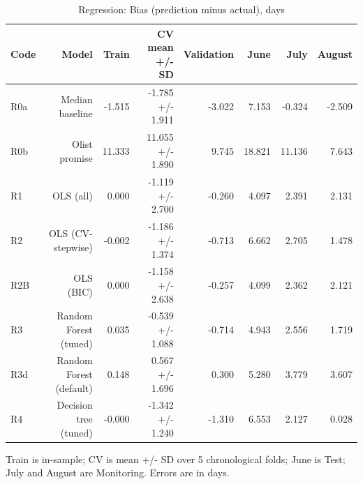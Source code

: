 \begin{table}[htbp]
\centering
\small
\caption{Regression: Bias (prediction minus actual), days}
\begin{tabular}{lrrrrrrr}
\toprule
Code & Model & Train & CV mean +/- SD & Validation & June & July & August \\
\midrule
R0a & Median baseline & -1.515 & -1.785 +/- 1.911 & -3.022 & 7.153 & -0.324 & -2.509 \\
R0b & Olist promise & 11.333 & 11.055 +/- 1.890 & 9.745 & 18.821 & 11.136 & 7.643 \\
R1 & OLS (all) & 0.000 & -1.119 +/- 2.700 & -0.260 & 4.097 & 2.391 & 2.131 \\
R2 & OLS (CV-stepwise) & -0.002 & -1.186 +/- 1.374 & -0.713 & 6.662 & 2.705 & 1.478 \\
R2B & OLS (BIC) & 0.000 & -1.158 +/- 2.638 & -0.257 & 4.099 & 2.362 & 2.121 \\
R3 & Random Forest (tuned) & 0.035 & -0.539 +/- 1.088 & -0.714 & 4.943 & 2.556 & 1.719 \\
R3d & Random Forest (default) & 0.148 & 0.567 +/- 1.696 & 0.300 & 5.280 & 3.779 & 3.607 \\
R4 & Decision tree (tuned) & -0.000 & -1.342 +/- 1.240 & -1.310 & 6.553 & 2.127 & 0.028 \\
\bottomrule
\end{tabular}
\par\smallskip\begin{minipage}{\linewidth}\footnotesize Train is in-sample; CV is mean +/- SD over 5 chronological folds; June is Test; July and August are Monitoring. Errors are in days.\end{minipage}
\end{table}

